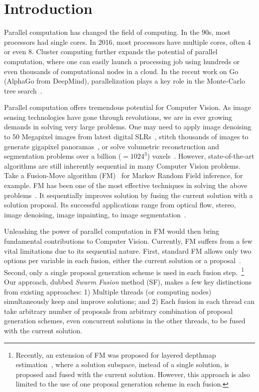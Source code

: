 \section{Introduction}
Parallel computation has changed the field of computing.  In the 90s,
most processors had single cores. In 2016, most processors have multiple
cores, often 4 or even 8. Cluster computing further expands the
potential of parallel computation, where one can easily launch a
processing job using hundreds or even thousands of computational nodes
in a cloud.
%
In the recent work on Go (AlphaGo from DeepMind), parallelization plays
a key role in the Monte-Carlo tree search~\cite{nature_alpha_go}.


Parallel computation offers tremendous potential for Computer Vision. As
image sensing technologies have gone through revolutions, we are in
ever growing demands in solving very large problems. One may need to
apply image denoising to 50 Megapixel images from latest digital
SLRs~\cite{canon?}, stitch thousands of images to generate gigapixel
panoramas~\cite{gigapan}, or solve volumetric reconstruction and
segmentation problems over a billion ($=1024^3$)
voxels~\cite{Joint3DSceneReconstructionandclassSegmentation}.
%
%
However, state-of-the-art algorithms are still inherently sequential in
many Computer Vision problems. Take a Fusion-Move algorithm
(FM)~\cite{viktor,second_order_stereo,else} for Markov Random Field
inference, for example. FM has been one of the most effective techniques
in solving the above
problems~\cite{fusion_moves_for_markov_random_field_optimization}.
%
It sequentially improves solution by fusing the current solution with a
solution proposal. Its successful applications range from optical flow,
stereo, image denoising, image inpainting, to image
segmentation~\cite{fusion_moves_for_markov_random_field_optimization}.


Unleashing the power of parallel computation in FM
would then bring fundamental contributions to Computer
Vision. Currently, FM suffers from a few vital limitations due to its
sequential nature. First, standard FM allows only two options per
variable in each fusion, either the current solution or a
proposal~\cite{fusion_moves_for_markov_random_field_optimization}. Second,
only a single proposal generation scheme is used in each fusion
step.~\footnote{Recently, an extension of FM was proposed for layered
depthmap estimation~\cite{chen_2016}, where a solution subspace, instead
of a single solution, is proposed and fused with the current
solution. However, this approach is also limited to the use of one proposal
generation scheme in each fusion.}
%
Our approach, dubbed {\it Swarm Fusion} method (SF), makes a
few key distinctions from existing approaches: 1) Multiple threads (or
computing nodes) simultaneously keep and improve solutions; and 2) Each
fusion in each thread can take arbitrary number of proposals from
arbitrary combination of proposal generation schemes, even concurrent
solutions in the other threads, to be fused with the current solution.
%


